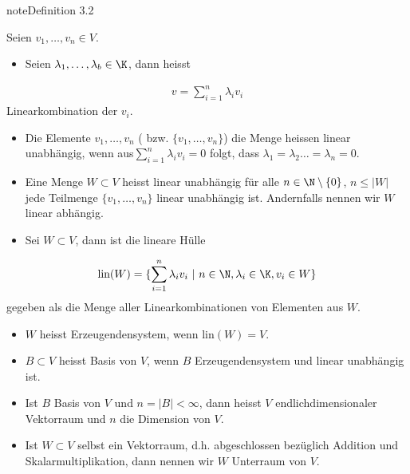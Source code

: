 \documentclass[letterpaper,10pt,english]{jupyterBook}
\begin{document}
\begin{sphinxadmonition}{note}{Definition 3.2}



Seien \(v_1,\ldots,v_n \in V\).
\begin{itemize}
\item {} 
Seien \(\lambda_1,\ldots,\lambda_b \in \K\), dann heisst

\end{itemize}
\begin{equation*}
\begin{split} v = \sum_{i=1}^n \lambda_i v_i\end{split}
\end{equation*}
Linearkombination der \(v_i\).
\begin{itemize}
\item {} 
Die Elemente \(v_1,\ldots,v_n\) ( bzw. \(\{v_1,\ldots,v_n\}\)) die Menge heissen linear unabhängig, wenn aus\(\sum_{i=1}^n \lambda_i v_i =0\) folgt, dass \(\lambda_1 = \lambda_2 \ldots = \lambda_n = 0\).

\item {} 
Eine Menge \(W \subset V\) heisst linear unabhängig für alle \(n \in \N \setminus \{0\}\), \(n \leq |W|\) jede Teilmenge \(\{v_1,\ldots,v_n\}\) linear unabhängig ist. Andernfalls nennen wir \(W\) linear abhängig.

\item {} 
Sei \(W \subset V\), dann ist die lineare Hülle

\end{itemize}
\begin{equation*}
\begin{split} \text{lin}(W) = \{ \sum_{i=1}^n \lambda_i v_i~|~ n \in \N, \lambda_i \in \K, v_i \in W\}\end{split}
\end{equation*}
gegeben als die Menge aller Linearkombinationen von Elementen aus \(W\).
\begin{itemize}
\item {} 
\(W\) heisst Erzeugendensystem, wenn lin\((W)=V\).

\item {} 
\(B \subset V\) heisst Basis von \(V\), wenn \(B\) Erzeugendensystem und linear unabhängig ist.

\item {} 
Ist \(B\) Basis von \(V\) und \(n=|B| < \infty\), dann heisst \(V\) endlichdimensionaler Vektorraum und \(n\) die Dimension von \(V\).

\item {} 
Ist \(W \subset V\) selbst ein Vektorraum, d.h. abgeschlossen bezüglich Addition und Skalarmultiplikation, dann nennen wir \(W\) Unterraum von \(V\).

\end{itemize}
\end{sphinxadmonition}
\end{document}
